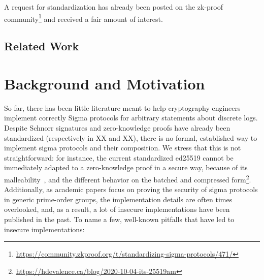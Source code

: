 \documentclass[runningheads]{llncs}
\begin{document}
A request for standardization has already been posted on the zk-proof community\footnote{\url{https://community.zkproof.org/t/standardizing-sigma-protocols/471/}} and received a fair amount of interest.

\subsection{Related Work}

\section{Background and Motivation}
\label{sec:motivation}
So far, there has been little literature meant to help cryptography engineers implement correctly Sigma protocols for arbitrary statements about discrete logs.
Despite Schnorr signatures and zero-knowledge proofs have already been standardized (respectively in XX and XX), there is no formal, established way to implement sigma protocols and their composition. We stress that this is not straightforward:
 for instance, the current standardized ed25519 cannot be immediately adapted to a zero-knowledge proof in a secure way, because of its malleability~\cite[p. 7]{JC:BDLSY1},  and the different behavior on the batched and compressed form\footnote{\url{https://hdevalence.ca/blog/2020-10-04-its-25519am}}.
 Additionally, as academic papers focus on proving the security of sigma protocols in generic prime-order groups, the implementation details are often times overlooked, and, as a result, a lot of insecure implementations have been published in the past. To name a few, well-known pitfalls that have led to insecure implementations:
\end{document}
